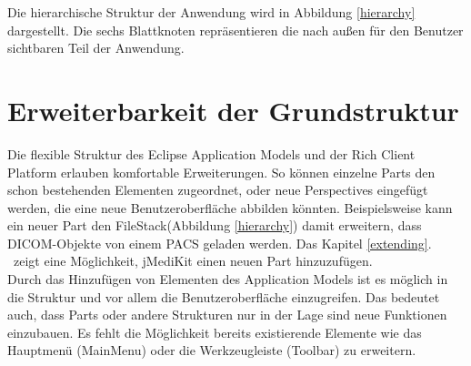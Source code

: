 Die hierarchische Struktur der Anwendung wird in Abbildung \ref{hierarchy} dargestellt. Die sechs Blattknoten repräsentieren die nach außen für den Benutzer sichtbaren Teil der Anwendung. 


\section{Erweiterbarkeit der Grundstruktur} \label{hierarchyextending}
Die flexible Struktur des Eclipse Application Models und der Rich Client Platform erlauben komfortable Erweiterungen. So können einzelne Parts den schon bestehenden Elementen zugeordnet, oder neue Perspectives eingefügt werden, die eine neue Benutzeroberfläche abbilden könnten. Beispielsweise kann ein neuer Part den FileStack(Abbildung \ref{hierarchy}) damit erweitern, dass DICOM-Objekte von einem PACS geladen werden. Das Kapitel \glqq \ref{extending}. \grqq\ zeigt eine Möglichkeit, jMediKit einen neuen Part hinzuzufügen.\\
Durch das Hinzufügen von Elementen des Application Models ist es möglich in die Struktur und vor allem die Benutzeroberfläche einzugreifen. Das bedeutet auch, dass Parts oder andere Strukturen nur in der Lage sind neue Funktionen einzubauen. Es fehlt die Möglichkeit bereits existierende Elemente wie das Hauptmenü (MainMenu) oder die Werkzeugleiste (Toolbar) zu erweitern.


